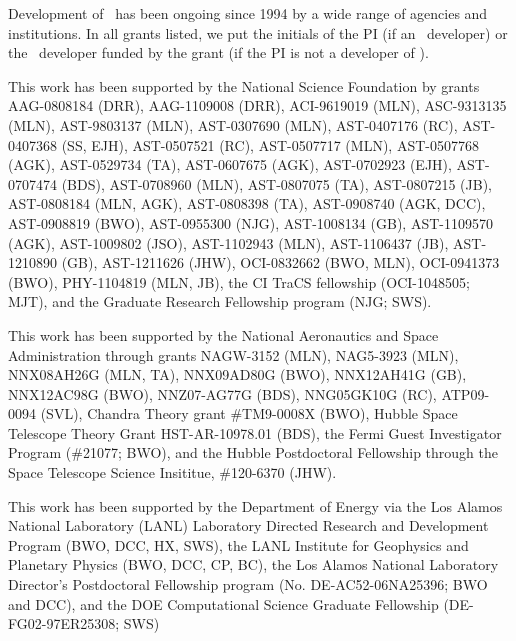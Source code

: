 
\acknowledgments

Development of \enzo\ has been ongoing since 1994 by a wide range of
agencies and institutions.  In all grants listed, we put the
initials of the PI (if an \enzo\ developer) or the \enzo\ developer
funded by the grant (if the PI is not a developer of \enzo).

This work has been supported by the National Science Foundation by
grants
AAG-0808184 (DRR),
AAG-1109008 (DRR),
ACI-9619019 (MLN),
ASC-9313135 (MLN),
AST-9803137 (MLN), 
AST-0307690 (MLN), 
AST-0407176 (RC),
AST-0407368 (SS, EJH),
AST-0507521 (RC), 
AST-0507717 (MLN), 
AST-0507768 (AGK),
AST-0529734 (TA),
AST-0607675 (AGK),
AST-0702923 (EJH),
AST-0707474 (BDS), 
AST-0708960 (MLN), 
AST-0807075 (TA),
AST-0807215 (JB),
AST-0808184 (MLN, AGK),
AST-0808398 (TA),
AST-0908740 (AGK, DCC),
AST-0908819 (BWO), 
AST-0955300 (NJG),
AST-1008134 (GB),
AST-1109570 (AGK), 
AST-1009802 (JSO), 
AST-1102943 (MLN),
AST-1106437 (JB),
AST-1210890 (GB),
AST-1211626 (JHW),
OCI-0832662 (BWO, MLN),
OCI-0941373 (BWO),
PHY-1104819 (MLN, JB),
the CI TraCS fellowship (OCI-1048505; MJT),
and the Graduate Research Fellowship program (NJG; SWS).

This work has been supported by the National Aeronautics and Space
Administration through grants
NAGW-3152 (MLN),
NAG5-3923 (MLN),
NNX08AH26G (MLN, TA),
NNX09AD80G (BWO),
NNX12AH41G (GB),
NNX12AC98G (BWO),
NNZ07-AG77G (BDS),
NNG05GK10G (RC),
ATP09-0094 (SVL),
Chandra Theory grant \#TM9-0008X (BWO),
Hubble Space Telescope Theory Grant HST-AR-10978.01 (BDS),
the Fermi Guest Investigator Program (\#21077; BWO),
and the Hubble Postdoctoral Fellowship through the Space Telescope Science
Insititue, \#120-6370 (JHW).

This work has been supported by the Department of Energy via the
Los Alamos National Laboratory (LANL) Laboratory Directed Research and
Development Program (BWO, DCC, HX, SWS), 
the LANL Institute for Geophysics and Planetary Physics (BWO, DCC, CP,
BC),
the Los Alamos National Laboratory Director's Postdoctoral Fellowship
program (No. DE-AC52-06NA25396;
BWO and DCC), and the
DOE Computational Science Graduate Fellowship (DE-FG02-97ER25308; SWS)

